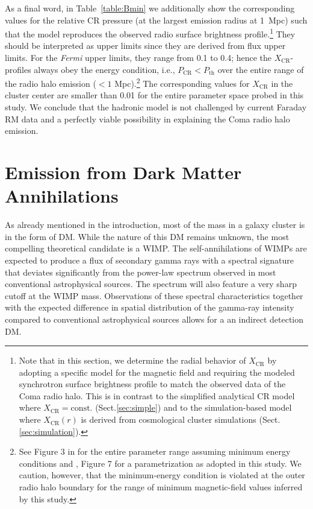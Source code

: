 \documentclass[12pt,manuscript]{aastex}
\newcommand{\rmn}{\mathrm}
\newcommand{\CR}{\mathrm{CR}}
\begin{document}
As a final word, in Table~\ref{table:Bmin} we additionally show the corresponding values for the
relative CR pressure (at the largest emission radius at 1~Mpc) such that the model reproduces the
observed radio surface brightness profile.\footnote{Note that in this section, we determine the
  radial behavior of $X_\CR$ by adopting a specific model for the magnetic field and requiring the
  modeled synchrotron surface brightness profile to match the observed data of the Coma radio
  halo. This is in contrast to the simplified analytical CR model where $X_\CR=\rmn{const.}$
  (Sect.\ref{sec:simple}) and to the simulation-based model where $X_\CR(r)$ is derived from
  cosmological cluster simulations (Sect.\ref{sec:simulation}).} They should be interpreted as upper
limits since they are derived from flux upper limits. For the {\em Fermi} upper limits, they range
from 0.1 to 0.4; hence the $X_{\CR}$-profiles always obey the energy condition, i.e., $P_{\CR} <
P_{\mathrm{th}}$ over the entire range of the radio halo emission ($< 1$ Mpc).\footnote{See Figure 3
  in \citet{article:PfrommerEnsslin:2004a} for the entire parameter range assuming minimum energy
  conditions and \citet{article:PfrommerEnsslin:2004b}, Figure 7 for a parametrization as adopted in
  this study.  We caution, however, that the minimum-energy condition is violated at the outer radio
  halo boundary for the range of minimum magnetic-field values inferred by this study.} The
corresponding values for $X_\CR$ in the cluster center are smaller than 0.01 for the entire
parameter space probed in this study. We conclude that the hadronic model is not challenged by
current Faraday RM data and a perfectly viable possibility in explaining the Coma radio halo
emission.

%
%

\section{Emission from Dark Matter Annihilations}
As already mentioned in the introduction, most of the mass in a galaxy cluster is in the form of
DM. While the nature of this DM remains unknown, the most compelling theoretical candidate is a
WIMP. The self-annihilations of WIMPs are expected to produce a flux of secondary gamma rays with a
spectral signature that deviates significantly from the power-law spectrum observed in most
conventional astrophysical sources. The spectrum will also feature a very sharp cutoff at the WIMP
mass. Observations of these spectral characteristics together with the expected difference in spatial
distribution of the gamma-ray intensity compared to conventional astrophysical sources allows for a
an indirect detection DM.
\end{document}
